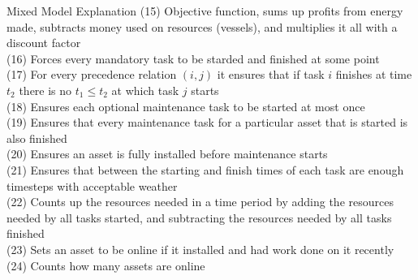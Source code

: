 \documentclass{beamer}
\begin{document}
\begin{frame}{Mixed Model Explanation}
\footnotesize
(15) Objective function, sums up profits from energy made, subtracts money used on resources (vessels), and multiplies it all with a discount factor	\\
(16) Forces every mandatory task to be starded and finished at some point	\\
(17) For every precedence relation $(i, j)$ it ensures that if task $i$ finishes at time $t_2$ there is no $t_1 \leq t_2$ at which task $j$ starts 	\\
(18) Ensures each optional maintenance task to be started at most once 	\\
(19) Ensures that every maintenance task for a particular asset that is started is also finished \\
(20) Ensures an asset is fully installed before maintenance starts	\\
(21) Ensures that between the starting and finish times of each task are enough timesteps with acceptable weather	\\
(22) Counts up the resources needed in a time period by adding the resources needed by all tasks started, and subtracting the resources needed by all tasks finished	\\
(23) Sets an asset to be online if it installed and had work done on it recently \\
(24) Counts how many assets are online	
\end{frame}
\end{document}
